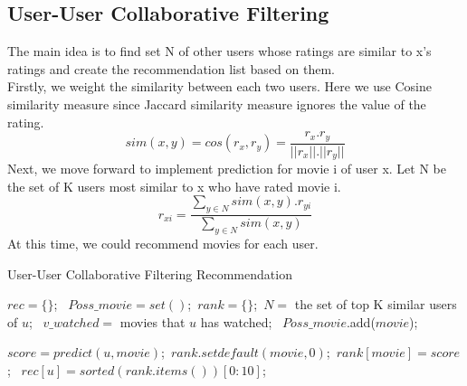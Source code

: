 \documentclass[sigconf]{acmart}
\begin{document}
\subsection{User-User Collaborative Filtering}
\item{The main idea is to find set N of other users whose ratings are similar to x's ratings and create the recommendation list based on them.\\
Firstly, we weight the similarity between each two users. Here we use Cosine similarity measure since Jaccard similarity measure ignores the value of the rating.
\begin{equation} 
sim(x,y)=cos(r_x,r_y)=\frac{r_x.r_y}{||r_x||.||r_y||}
\end{equation}
Next, we move forward to implement prediction for movie i of user x. Let N be the set of K users most similar to x who have rated movie i.
\begin{equation} 
r_{xi}=\frac{\sum_{y\in N}sim(x,y).r_{yi}}{\sum_{y\in N}sim(x,y)}
\end{equation}
At this time, we could recommend movies for each user. 
\begin{algorithm}
\caption{User-User Collaborative Filtering Recommendation}
\label{alg:A}
\begin{algorithmic}
\STATE $rec=\{\}$;\
\STATE $Poss\_movie=set()$;\
\STATE $rank=\{\}$;\
\STATE $N=$ the set of top K similar users of $u$;\
\STATE $v\_watched=$ movies that $u$ has watched;\
\STATE $Poss\_movie$.add($movie$);\
\ENDIF 
\ENDFOR

\ENDFOR
\FOR{each $movie \in Poss\_movie$}

\STATE $score=predict (u,movie)$;\
\STATE $rank.setdefault(movie, 0)$;\
\STATE $rank[movie]=score$;\
\ENDFOR
\STATE  $rec[u]=sorted(rank.items())[0:10]$;\
\ENDFOR
\end{algorithmic}
\end{algorithm}

}
\end{document}
